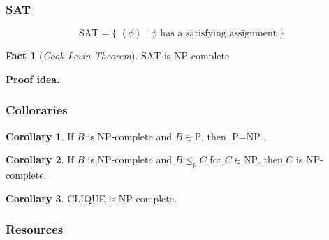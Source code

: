 \documentclass[notheorems]{beamer}
\theoremstyle{definition}
\newtheorem{corollary}{Corollary}
\newtheorem{fact}{Fact}
\theoremstyle{remark}
\newcommand{\pclass}{\text{P}}
\newcommand{\npclass}{\text{NP}}
\newcommand{\satprob}{\text{SAT}}
\newcommand{\lpp}{\left \langle}
\newcommand{\rpp}{\right \rangle}
\newcommand{\enc}[1]{\lpp #1 \rpp}
\begin{document}
\begin{frame}
    \frametitle{SAT}

    \[
        \satprob = \{ \;\enc{\phi} \mid \phi \text{ has a satisfying assignment} \; \}
    \]

    \pause

    \begin{fact}[\emph{Cook-Levin Theorem}]
        \(\satprob \text{ is NP-complete}\)
    \end{fact}

    \textbf{Proof idea.}

\end{frame}

\begin{frame}
    \frametitle{Colloraries}

    \pause

    \begin{corollary}
        If \(B\) is NP-complete and \(B \in \pclass\), then \(\pclass=\npclass\).
    \end{corollary}

    \pause

    \begin{corollary}
        If \(B\) is NP-complete and \(B \leq_p C\) for \(C \in \npclass\), then \(C\) is NP-complete.
    \end{corollary}

    \pause

    \begin{corollary}
        CLIQUE is NP-complete.
    \end{corollary}
\end{frame}

\begin{frame}
    \frametitle{Resources}
    \nocite{*}
    \renewcommand{\refname}{\normalsize References}
    
    
\end{frame}
\end{document}
